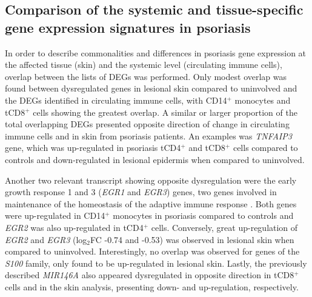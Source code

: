 



\subsection{Comparison of the systemic and tissue-specific gene expression signatures in psoriasis}

In order to describe commonalities and differences in psoriasis gene expression at the affected tissue (skin) and the systemic level (circulating immune cells), overlap between the lists of DEGs was performed. Only modest overlap was found between dysregulated genes in lesional skin compared to uninvolved and the DEGs identified in circulating immune cells, with CD14$^+$ monocytes and tCD8$^+$ cells showing the greatest overlap. A similar or larger proportion of the total overlapping DEGs presented opposite direction of change in circulating immune cells and in skin from psoriasis patients. An examples was \textit{TNFAIP3} gene, which was up-regulated in psoriasis tCD4$^+$ and tCD8$^+$ cells compared to controls and down-regulated in lesional epidermis when compared to uninvolved.  

Another two relevant transcript showing opposite dysregulation were the early growth response 1 and 3 (\textit{EGR1} and \textit{EGR3}) genes, two genes involved in maintenance of the homeostasis of the adaptive immune response \parencite{Li2012}. Both genes were up-regulated in CD14$^+$ monocytes in psoriasis compared to controls and \textit{EGR2} was also up-regulated in tCD4$^+$ cells. Conversely, great up-regulation of \textit{EGR2} and \textit{EGR3} (log$_{2}$FC -0.74 and -0.53) was observed in 
lesional skin when compared to uninvolved. Interestingly, no overlap was observed for genes of the \textit{S100} family, only found to be up-regulated in lesional skin. Lastly, the previously described \textit{MIR146A} also appeared dysregulated in opposite direction in tCD8$^+$ cells and in the skin analysis, presenting down- and up-regulation, respectively.

